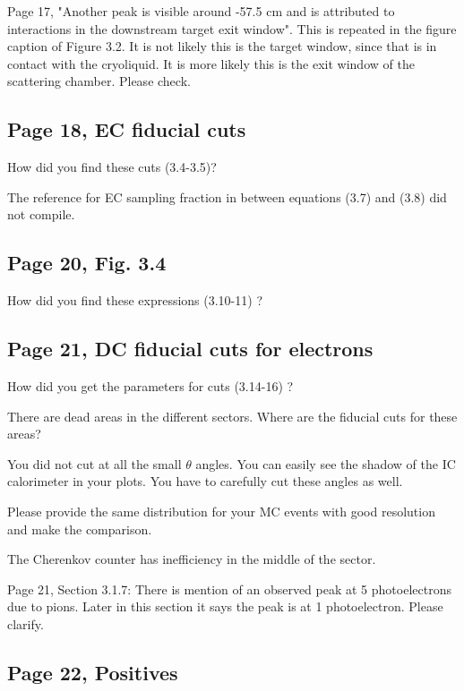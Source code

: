 \documentclass[11pt]{paper}
\begin{document}
Page 17, "Another peak is visible around -57.5 cm and is attributed to interactions in the downstream target exit window". This is repeated in the figure caption of Figure 3.2. It is not likely this is the target window, since that is in contact with the cryoliquid. It is more likely this is the exit window of the scattering chamber. Please check. 

 \subsection*{Page 18, EC fiducial cuts}
 
 How did you find these cuts (3.4-3.5)? 

The reference for EC sampling fraction in between equations (3.7) and (3.8) did not compile.

\subsection*{Page 20, Fig. 3.4}
How did you find these expressions (3.10-11) ?


\subsection*{Page 21, DC fiducial cuts for electrons}
How did you get the parameters for cuts (3.14-16) ?

There are dead areas in the different sectors. Where are the fiducial cuts for these areas?

You did not cut at all the small $\theta$ angles. You can easily see the shadow of the IC calorimeter
in your plots. You have to carefully cut these angles as well.

Please provide the same distribution for your MC events with good resolution and make the comparison.

The Cherenkov counter has inefficiency in the middle of the sector.  

Page 21, Section 3.1.7: There is mention of an observed peak at 5 photoelectrons due to pions. Later in this section it says the peak is at 1 photoelectron. Please clarify. 

\subsection*{Page 22, Positives}
\end{document}
